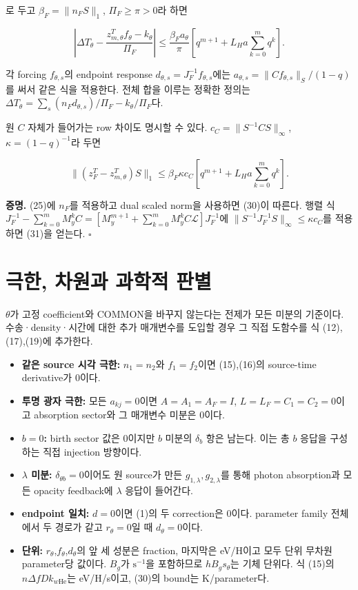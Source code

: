 로 두고 \(\beta_F=\lVert n_FS\rVert_1\), \(\Pi_F\ge\pi>0\)라 하면

\[
\boxed{\left|\Delta T_\theta-
\frac{z_{m,\theta}^Tf_\theta-k_\theta}{\Pi_F}\right|
\le\frac{\beta_Fa_\theta}{\pi}
\left[q^{m+1}+L_Ha\sum_{k=0}^mq^k\right].}
\tag{30}
\]

각 forcing \(f_{\theta,s}\)의 endpoint response \(d_{\theta,s}=J_F^{-1}f_{\theta,s}\)에는 \(a_{\theta,s}=\lVert Cf_{\theta,s}\rVert_S/(1-q)\)를 써서 같은 식을 적용한다. 전체 합을 이루는 정확한 정의는 \(\Delta T_\theta=\sum_s(n_Fd_{\theta,s})/\Pi_F-k_\theta/\Pi_F\)다.

원 \(C\) 자체가 들어가는 row 차이도 명시할 수 있다. \(c_C=\lVert S^{-1}CS\rVert_\infty\), \(\kappa=(1-q)^{-1}\)라 두면

\[
\boxed{\|(z_F^T-z_{m,\theta}^T)S\|_1
\le\beta_F\kappa c_C
\left[q^{m+1}+L_Ha\sum_{k=0}^mq^k\right].}
\tag{31}
\]

\textbf{증명.} (25)에 \(n_F\)를 적용하고 dual scaled norm을 사용하면 (30)이 따른다. 행렬 식 \(J_F^{-1}-\sum_{k=0}^{m}M_y^kC=[M_y^{m+1}+\sum_{k=0}^{m}M_y^kC\mathcal L]J_F^{-1}\)에 \(\lVert S^{-1}J_F^{-1}S\rVert_\infty\le\kappa c_C\)를 적용하면 (31)을 얻는다. \(\square\)

\hypertarget{uxadf9uxd55c-uxcc28uxc6d0uxacfc-uxacfcuxd559uxc801-uxd310uxbcc4}{%
\section{극한, 차원과 과학적 판별}\label{uxadf9uxd55c-uxcc28uxc6d0uxacfc-uxacfcuxd559uxc801-uxd310uxbcc4}}

\(\theta\)가 고정 coefficient와 COMMON을 바꾸지 않는다는 전제가 모든 미분의 기준이다. 수송·density·시간에 대한 추가 매개변수를 도입할 경우 그 직접 도함수를 식 (12),(17),(19)에 추가한다.

\begin{itemize}
\tightlist
\item
  \textbf{같은 source 시각 극한:} \(n_1=n_2\)와 \(f_1=f_2\)이면 (15),(16)의 source-time derivative가 0이다.
\item
  \textbf{투명 광자 극한:} 모든 \(a_{kj}=0\)이면 \(A=A_1=A_F=I\), \(L=L_F=C_1=C_2=0\)이고 absorption sector와 그 매개변수 미분은 0이다.
\item
  \textbf{\(b=0\):} birth sector 값은 0이지만 \(b\) 미분의 \(\delta_b\) 항은 남는다. 이는 총 \(b\) 응답을 구성하는 직접 injection 방향이다.
\item
  \textbf{\(\lambda\) 미분:} \(\delta_{\theta b}=0\)이어도 원 source가 만든 \(g_{1,\lambda},g_{2,\lambda}\)를 통해 photon absorption과 모든 opacity feedback에 \(\lambda\) 응답이 들어간다.
\item
  \textbf{endpoint 일치:} \(d=0\)이면 (1)의 두 correction은 0이다. parameter family 전체에서 두 경로가 같고 \(r_\theta=0\)일 때 \(d_\theta=0\)이다.
\item
  \textbf{단위:} \(r_\theta\),\(f_\theta\),\(d_\theta\)의 앞 세 성분은 fraction, 마지막은 eV/H이고 모두 단위 무차원 parameter당 값이다. \(B_g\)가 \(\mathrm{s}^{-1}\)을 포함하므로 \(hB_gs_\theta\)는 기체 단위다. 식 (15)의 \(n\Delta fDk_{w\mathrm{He}}\)는 eV/H/s이고, (30)의 bound는 K/parameter다.
\end{itemize}


